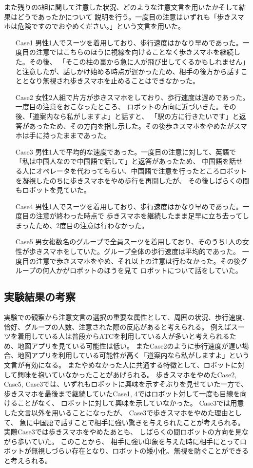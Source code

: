 \documentclass{kuisthesis}
\begin{document}
また残りの5組に関して注意した状況、どのような注意文言を用いたかそして結果はどうであったかについて
説明を行う。一度目の注意はいずれも「歩きスマホは危険ですのでおやめください。」という文言を用いた。
\begin{enumerate}
  \item[Case1] 男性1人でスーツを着用しており、歩行速度はかなり早めであった。一度目の注意ではこちらのほうに視線を向けることなく歩きスマホを継続した。その後、
  「そこの柱の裏から急に人が飛び出してくるかもしれません」
  と注意したが、話しかけ始める時点が遅かったため、相手の後方から話すこととなり無視され歩きスマホを止めることはできなかった。
  \item[Case2] 女性2人組で片方が歩きスマホをしており、歩行速度は遅めであった。一度目の注意をおこなったところ、
  ロボットの方向に近づいきた。その後、「道案内なら私がしますよ」と話すと、
  「駅の方に行きたいです」と返答があったため、その方向を指し示した。その後歩きスマホをやめたがスマホは手に持ったままであった。
  \item[Case3] 男性1人で平均的な速度であった。一度目の注意に対して、英語で「私は中国人なので中国語で話して」と返答があったため、
  中国語を話せる人にオペレータを代わってもらい、中国語で注意を行ったところロボットを凝視したのちに歩きスマホをやめ歩行を再開したが、
  その後しばらくの間もロボットを見ていた。
  \item[Case4] 男性1人でスーツを着用しており、歩行速度はかなり早めであった。一度目の注意が終わった時点で
  歩きスマホを継続したまま足早に立ち去ってしまったため、2度目の注意は行わなかった。
  \item[Case5] 男女複数名のグループで全員スーツを着用しており、そのうち1人の女性が歩きスマホをしていた。グループ全体の歩行速度は平均的であった。
  一度目の注意で歩きスマホをやめ、それ以上の注意は行わなかった。その後グループの何人かがロボットのほうを見て
  ロボットについて話をしていた。
\end{enumerate}

\subsection{実験結果の考察}
実験での観察から注意文言の選択の重要な属性として、周囲の状況、歩行速度、恰好、グループの人数、注意された際の反応があると考えられる。
例えばスーツを着用している人は普段からATCを利用している人が多いと考えられるため、地図アプリを見ている可能性は低い。
またCase2のように歩行速度が遅い場合、地図アプリを利用している可能性が高く「道案内なら私がしますよ」という文言が有効になる。
またやめなかった人に共通する特徴として、ロボットに対して興味を抱いていなかったことがあげられる。
歩きスマホをやめたCase2, Case5, Case3では、いずれもロボットに興味を示すそぶりを見せていた一方で、
歩きスマホを最後まで継続していたCase1, 4ではロボット対して一度も目線を向けることがなく、
ロボットに対して興味を示していなかった。
Case3では用意した文言以外を用いることになったが、
Case3で歩きスマホをやめた理由として、
急に中国語で話すことで相手に強い驚きを与えられたことが考えられる。
実際Case3では歩きスマホをやめたあとも、
しばらくの間ロボットの方向を見ながら歩いていた。
このことから、
相手に強い印象を与えた時に相手にとってロボットが無視しづらい存在となり、ロボットの矮小化、無視を防ぐことができる
と考えられる。
\end{document}
